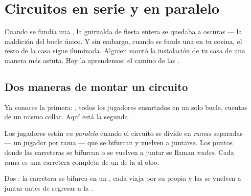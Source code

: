 \chapter{Circuitos en serie y en paralelo}\label{ch:g5:series-parallel-circuits}

Cuando se fundía una , la guirnalda de fiesta entera se
quedaba a oscuras --- la maldición del bucle único. Y sin embargo,
cuando se funde una  en tu cocina, el resto de la casa sigue
iluminada. Alguien montó la instalación de tu casa de una manera más
astuta. Hoy la aprendemos: el camino de las .

\section{Dos maneras de montar un circuito}

Ya conoces la primera: \emph{}, todos los jugadores
ensartados en un solo bucle, cuentas de un mismo collar. Aquí está la
segunda.

\begin{definition}[En paralelo]\label{def:g5:series-parallel-circuits:parallel}
Los jugadores están \emph{en paralelo}
cuando el circuito se divide en \emph{ramas} separadas ---
un jugador por rama --- que se bifurcan y vuelven a juntarse. Los
puntos donde las carreteras se bifurcan o se vuelven a juntar se
llaman \emph{nudos}. Cada rama es una carretera completa
de un  de la  al otro.
\end{definition}

\begin{omfigure}

{\small Dos  : la carretera se bifurca en un
, cada  viaja por su propia  y las 
se vuelven a juntar antes de regresar a la .}
\end{omfigure}


